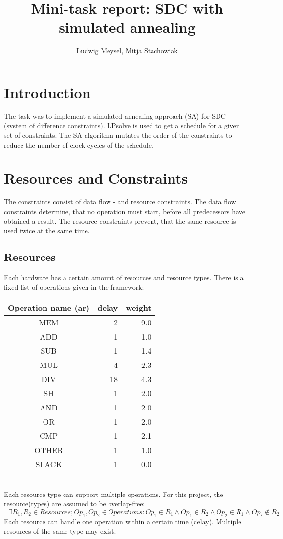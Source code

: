 \documentclass[colorback,accentcolor=tud1c,11pt]{tudreport}
\title{Mini-task report: SDC with simulated annealing}
\subtitle{Ludwig Meysel, Mitja Stachowiak}
\begin{document}
  \maketitle

  \chapter{Introduction}
  The task was to implement a simulated annealing approach (SA) for SDC (\underline{s}ystem of \underline{d}ifference \underline{c}onstraints). LPsolve is used to get a schedule for a given set of constraints. The SA-algorithm mutates the order of the constraints to reduce the number of clock cycles of the schedule.
  
  
  
  \chapter{Resources and Constraints}
  The constraints consist of data flow - and resource constraints. The data flow constraints determine, that no operation must start, before all predecessors have obtained a result. The resource constraints prevent, that the same resource is used twice at the same time.
  
  \section{Resources}
  Each hardware has a certain amount of resources and resource types. There is a fixed list of operations given in the framework:\\
  \begin{tabular}{ c | r | r }
  	Operation name (ar) & delay & weight \\
  	\hline
  	MEM   &  2 & 9.0 \\
  	ADD   &  1 & 1.0 \\
  	SUB   &  1 & 1.4 \\
  	MUL   &  4 & 2.3 \\
  	DIV   & 18 & 4.3 \\
  	SH    &  1 & 2.0 \\
  	AND   &  1 & 2.0 \\
  	OR    &  1 & 2.0 \\
  	CMP   &  1 & 2.1 \\
  	OTHER &  1 & 1.0 \\
  	SLACK &  1 & 0.0 \\
  \end{tabular}\\
  Each resource type can support multiple operations. For this project, the resource(types) are assumed to be overlap-free:
  $$\neg \exists R_1, R_2 \in Resources; Op_1, Op_2 \in Operations : Op_1 \in R_1 \land Op_1 \in R_2 \land Op_2 \in R_1 \land Op_2 \notin R_2$$
  Each resource can handle one operation within a certain time (delay). Multiple resources of the same type may exist.
  
\end{document}
